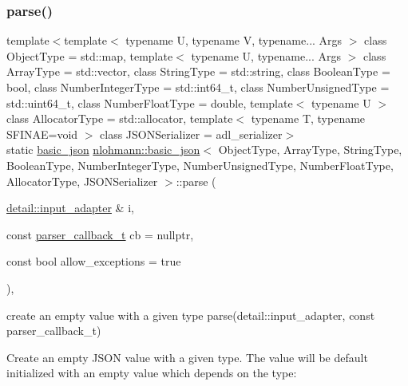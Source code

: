 \subsubsection{\texorpdfstring{parse()}{parse()}\hspace{0.1cm}{\footnotesize\ttfamily [2/3]}}
{\footnotesize\ttfamily template$<$template$<$ typename U, typename V, typename... Args $>$ class Object\+Type = std\+::map, template$<$ typename U, typename... Args $>$ class Array\+Type = std\+::vector, class String\+Type  = std\+::string, class Boolean\+Type  = bool, class Number\+Integer\+Type  = std\+::int64\+\_\+t, class Number\+Unsigned\+Type  = std\+::uint64\+\_\+t, class Number\+Float\+Type  = double, template$<$ typename U $>$ class Allocator\+Type = std\+::allocator, template$<$ typename T, typename S\+F\+I\+N\+A\+E=void $>$ class J\+S\+O\+N\+Serializer = adl\+\_\+serializer$>$ \\
static \mbox{\hyperlink{classnlohmann_1_1basic__json}{basic\+\_\+json}} \mbox{\hyperlink{classnlohmann_1_1basic__json}{nlohmann\+::basic\+\_\+json}}$<$ Object\+Type, Array\+Type, String\+Type, Boolean\+Type, Number\+Integer\+Type, Number\+Unsigned\+Type, Number\+Float\+Type, Allocator\+Type, J\+S\+O\+N\+Serializer $>$\+::parse (\begin{DoxyParamCaption}\item[{\mbox{\hyperlink{classnlohmann_1_1detail_1_1input__adapter}{detail\+::input\+\_\+adapter}} \&}]{i,  }\item[{const \mbox{\hyperlink{classnlohmann_1_1basic__json_ab4f78c5f9fd25172eeec84482e03f5b7}{parser\+\_\+callback\+\_\+t}}}]{cb = {\ttfamily nullptr},  }\item[{const bool}]{allow\+\_\+exceptions = {\ttfamily true} }\end{DoxyParamCaption})\hspace{0.3cm}{\ttfamily [inline]}, {\ttfamily [static]}}



create an empty value with a given type parse(detail\+::input\+\_\+adapter, const parser\+\_\+callback\+\_\+t) 

Create an empty J\+S\+ON value with a given type. The value will be default initialized with an empty value which depends on the type\+:


